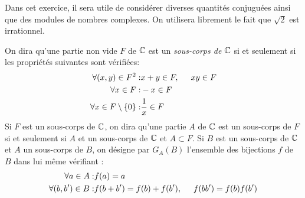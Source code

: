 Dans cet exercice, il sera utile de considérer diverses quantités conjuguées ainsi que des modules de nombres complexes. On utilisera librement le fait que $\sqrt{2}$ est irrationnel.

On dira qu'une partie non vide $F$ de $\mathbb{C}$ est un \emph{sous-corps de $\mathbb{C}$} si et seulement si les propriétés suivantes sont vérifiées:
\begin{align*}
 \forall(x,y)\in F^2  :& x+y \in F,  \hspace{0.5cm} xy \in F \\ 
 \forall x \in F      :& -x\in F  \\
 \forall x \in F\setminus \{0\} :& \frac{1}{x} \in F
\end{align*}
Si $F$ est un sous-corps de $\mathbb{C}$, on dira qu'une partie $A$ de $\mathbb{C}$ est un sous-corps de $F$ si et seulement si $A$ et un sous-corps de $\mathbb{C}$ et $A\subset F$.\newline
Si $B$ est un sous-corps de $\mathbb{C}$ et $A$ un sous-corps de $B$, on désigne par $G_A(B)$ l'ensemble des bijections $f$ de $B$ dans lui même vérifiant :
\begin{align*}
 \forall a\in A :& f(a)=a \\
 \forall(b,b')\in B :& f(b+b') = f(b)+f(b'), \hspace{0.5cm} f(bb') = f(b)f(b')
\end{align*}

